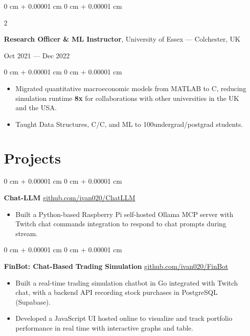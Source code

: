 \documentclass[letterpaper]{article}
\newenvironment{highlights}{
    \begin{itemize}[
        topsep=0.03 cm,
        parsep=0.03 cm,
        partopsep=0pt,
        itemsep=0pt,
        leftmargin=0 cm + 10pt
    \]
}{
    \end{itemize}
} %
\newenvironment{onecolentry}{
    \begin{adjustwidth}{
        0 cm + 0.00001 cm
    }{
        0 cm + 0.00001 cm
    }
}{
    \end{adjustwidth}
} %
\newenvironment{twocolentry}[2][]{
    \onecolentry
    \def\secondColumn{#2}
    \setcolumnwidth{\fill, 4.5 cm}
    \begin{paracol}{2}
}{
    \switchcolumn \raggedleft \secondColumn
    \end{paracol}
    \endonecolentry
} %
\let\hrefWithoutArrow\href
\begin{document}
        \begin{twocolentry}{Oct 2021 --- Dec 2022}
        \textbf{Research Officer \& ML Instructor}, University of Essex --- Colchester, UK
        \end{twocolentry}

        \begin{onecolentry}
        \begin{highlights}
        \item Migrated quantitative macroeconomic models from MATLAB to C\textplus\textplus, reducing simulation runtime {\bfseries 8x} for collaborations with other universities in the UK and the USA.
        \item Taught Data Structures, C/C\textplus\textplus, and ML to 100\textplus undergrad/postgrad students.
        \end{highlights}
        \end{onecolentry}

    \section{Projects}

    \begin{onecolentry}
        \textbf{Chat-LLM} \hfill \hrefWithoutArrow{https://github.com/ivan020/ChatLLM}{github.com/ivan020/ChatLLM}

        \begin{highlights}
            \item Built a Python-based Raspberry Pi self-hosted Ollama MCP server with Twitch chat commands integration to respond to chat prompts during stream.
        \end{highlights}
    \end{onecolentry}

    \begin{onecolentry}
        \textbf{FinBot: Chat-Based Trading Simulation} \hfill \hrefWithoutArrow{https://github.com/ivan020/FinBot}{github.com/ivan020/FinBot}

        \begin{highlights}
            \item Built a real-time trading simulation chatbot in Go integrated with Twitch chat, with a backend API recording stock purchases in PostgreSQL (Supabase).
            \item Developed a JavaScript UI hosted online to visualize and track portfolio performance in real time with interactive graphs and table.        
        \end{highlights}
    \end{onecolentry}
\end{document}
